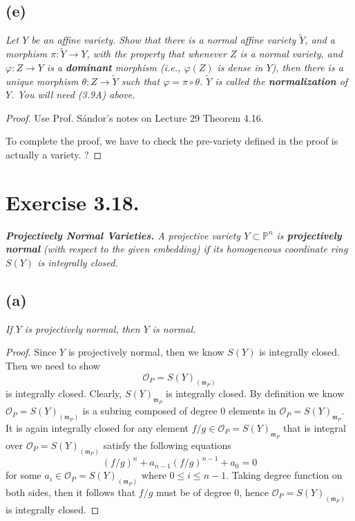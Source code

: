 \subsection{(e)}
\textit{Let $Y$ be an affine variety. Show that there is a normal affine variety $\widetilde Y$, and a morphism $\pi: \widetilde Y\to Y$, with the property that whenever $Z$ is a normal variety, and $\varphi:Z\to Y$ is a \textbf{dominant} morphism (i.e., $\varphi(Z)$ is dense in $Y$), then there is a unique morphism $\theta:Z\to \widetilde Y$ such that $\varphi=\pi\circ\theta$. $\widetilde Y$ is called the \textbf{normalization} of $Y$. You will need (3.9A) above.}

\begin{proof}
	Use Prof. S\'andor's notes on Lecture 29 Theorem 4.16.

	To complete the proof, we have to check the pre-variety defined in the proof is actually a variety. ?
\end{proof}

\section{Exercise 3.18.}
\textit{\textbf{Projectively Normal Varieties.} A projective variety $Y\subset \mathbb P^n$ is \textbf{projectively normal} (with respect to the given embedding) if its homogeneous coordinate ring $S(Y)$ is integrally closed.}

\subsection{(a)}
\textit{If $Y$ is projectively normal, then $Y$ is normal.}

\begin{proof}
Since $Y$ is projectively normal, then we know $S(Y)$ is integrally closed. Then we need to show 
\[\mathscr O_P=S(Y)_{(\mathfrak m_P)}\] is integrally closed. Clearly, $S(Y)_{\mathfrak m_P}$ is integrally closed. By definition we know $\mathscr O_P=S(Y)_{(\mathfrak m_P)}$ is a subring composed of degree $0$ elements in $\mathscr O_P=S(Y)_{\mathfrak m_P}$. It is again integrally closed for any element $f/g\in \mathscr O_P=S(Y)_{\mathfrak m_P}$ that is integral over $\mathscr O_P=S(Y)_{(\mathfrak m_P)}$ satisfy the following equations 
\[(f/g)^n+a_{n-1}(f/g)^{n-1}+a_0=0\] for some $a_{i}\in \mathscr O_P=S(Y)_{(\mathfrak m_P)}$ where $0\leq i\leq n-1$. Taking degree function on both sides, then it follows that $f/g$ must be of degree $0$, hence $\mathscr O_P=S(Y)_{(\mathfrak m_P)}$ is integrally closed. 

\end{proof}

